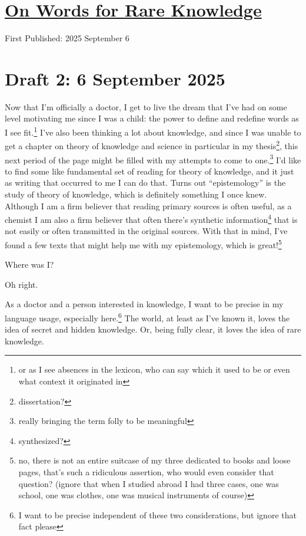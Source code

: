 \documentclass[12pt]{article}
\newcommand{\say}[1]{``#1''}
\renewcommand{\,}{\textsuperscript{,}}
\begin{document}
  
\doublespacing  
\section{\href{words-rare-knowledge.html}{On Words for Rare Knowledge}}  
First Published: 2025 September 6

\section{Draft 2: 6 September 2025}

Now that I'm officially a doctor, I get to live the dream that I've had on some level motivating me since I was a child: the power to define and redefine words as I see fit.\footnote{or as I see absences in the lexicon, who can say which it used to be or even what context it originated in}  
I've also been thinking a lot about knowledge, and since I was unable to get a chapter on theory of knowledge and science in particular in my thesis\footnote{dissertation?}, this next period of the page might be filled with my attempts to come to one.\footnote{really bringing the term folly to be meaningful}  
I'd like to find some like fundamental set of reading for theory of knowledge, and it just as writing that occurred to me I can do that.  
Turns out \say{epistemology} is the study of theory of knowledge, which is definitely something I once knew.  
Although I am a firm believer that reading primary sources is often useful, as a chemist I am also a firm believer that often there's synthetic information\footnote{synthesized?} that is not easily or often transmitted in the original sources.  
With that in mind, I've found a few texts that might help me with my epistemology, which is great!\footnote{no, there is not an entire suitcase of my three dedicated to books and loose pages, that's such a ridiculous assertion, who would even consider that question? (ignore that when I studied abroad I had three cases, one was school, one was clothes, one was musical instruments of course)}

Where was I?

Oh right.

As a doctor and a person interested in knowledge, I want to be precise in my language usage, especially here.\footnote{I want to be precise independent of these two considerations, but ignore that fact please}  
The world, at least as I've known it, loves the idea of secret and hidden knowledge.  
Or, being fully clear, it loves the idea of rare knowledge.
\end{document}
